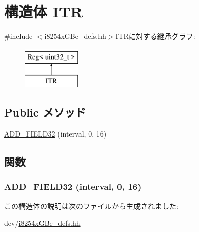 \hypertarget{structiGbReg_1_1Regs_1_1ITR}{
\section{構造体 ITR}
\label{structiGbReg_1_1Regs_1_1ITR}
}


{\ttfamily \#include $<$i8254xGBe\_\-defs.hh$>$}ITRに対する継承グラフ:\begin{figure}[H]
\begin{center}
\leavevmode
\includegraphics[height=2cm]{structiGbReg_1_1Regs_1_1ITR}
\end{center}
\end{figure}
\subsection*{Public メソッド}
\begin{DoxyCompactItemize}
\item 
\hyperlink{structiGbReg_1_1Regs_1_1ITR_afe30f364c9f4d2d540b309445e2e2cf2}{ADD\_\-FIELD32} (interval, 0, 16)
\end{DoxyCompactItemize}


\subsection{関数}
\hypertarget{structiGbReg_1_1Regs_1_1ITR_afe30f364c9f4d2d540b309445e2e2cf2}{
\subsubsection[{ADD\_\-FIELD32}]{\setlength{\rightskip}{0pt plus 5cm}ADD\_\-FIELD32 (interval, \/  0, \/  16)}}
\label{structiGbReg_1_1Regs_1_1ITR_afe30f364c9f4d2d540b309445e2e2cf2}


この構造体の説明は次のファイルから生成されました:\begin{DoxyCompactItemize}
\item 
dev/\hyperlink{i8254xGBe__defs_8hh}{i8254xGBe\_\-defs.hh}\end{DoxyCompactItemize}
